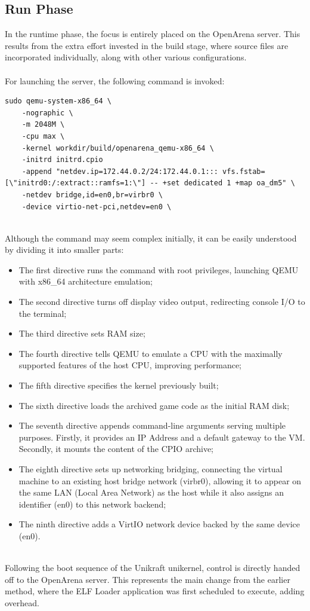 \subsection{Run Phase}
In the runtime phase, the focus is entirely placed on the OpenArena server.
This results from the extra effort invested in the build stage, where source files are incorporated individually, along with other various configurations. \\ \\
For launching the server, the following command is invoked:
\\
\lstset{basicstyle=\small\ttfamily, caption=Run Command, language=C, showstringspaces=false, keepspaces=true}
\begin{lstlisting}
sudo qemu-system-x86_64 \
    -nographic \
    -m 2048M \
    -cpu max \
    -kernel workdir/build/openarena_qemu-x86_64 \
    -initrd initrd.cpio
    -append "netdev.ip=172.44.0.2/24:172.44.0.1::: vfs.fstab=[\"initrd0:/:extract::ramfs=1:\"] -- +set dedicated 1 +map oa_dm5" \
    -netdev bridge,id=en0,br=virbr0 \
    -device virtio-net-pci,netdev=en0 \
\end{lstlisting}
\\
Although the command may seem complex initially, it can be easily understood by dividing it into smaller parts:
\begin{itemize}
    \item The first directive runs the command with root privileges, launching QEMU with x86_64 architecture emulation;
    \item The second directive turns off display video output, redirecting console I/O to the terminal;
    \item The third directive sets RAM size;
    \item The fourth directive tells QEMU to emulate a CPU with the maximally supported features of the host CPU, improving performance;
    \item The fifth directive specifies the kernel previously built;
    \item The sixth directive loads the archived game code as the initial RAM disk;
    \item The seventh directive appends command-line arguments serving multiple purposes. Firstly, it provides an IP Address and a default gateway to the VM. Secondly, it mounts the content
    of the CPIO archive;
    \item The eighth directive sets up networking bridging, connecting the virtual machine to an existing host bridge network (virbr0), allowing it to appear on the same LAN (Local Area Network) as the host while
    it also assigns an identifier (en0) to this network backend;
    \item The ninth directive adds a VirtIO network device backed by the same device (en0).
\end{itemize}
\\
Following the boot sequence of the Unikraft unikernel, control is directly handed off to the OpenArena server.
This represents the main change from the earlier method, where the ELF Loader application was first scheduled to execute, adding overhead.
